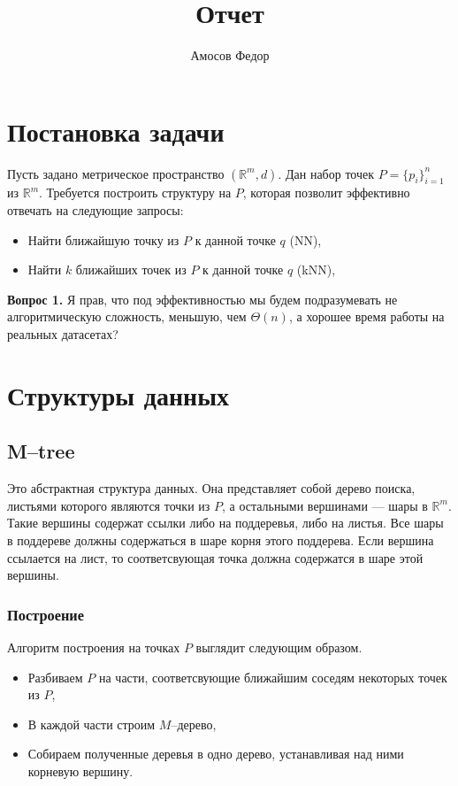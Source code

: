 \documentclass{article}
\title{\bf Отчет \No 1}
\author{Амосов Федор}
\begin{document}
    \maketitle
    
    \section{Постановка задачи}
        Пусть задано метрическое пространство $(\mathbb{R}^m, d)$. Дан набор точек $P = \{p_i\}_{i = 1}^n$ из $\mathbb{R}^m$. Требуется построить структуру на $P$, которая позволит эффективно отвечать на следующие запросы:
        \begin{itemize}
            \item Найти ближайшую точку из $P$ к данной точке $q$ (NN),
            \item Найти $k$ ближайших точек из $P$ к данной точке $q$ (kNN),
        \end{itemize}
        
        {\bf Вопрос 1.} Я прав, что под эффективностью мы будем подразумевать не алгоритмическую сложность, меньшую, чем $\Theta(n)$, а хорошее время работы на реальных датасетах?
    
    \section{Структуры данных}
        \subsection{M--tree}
            Это абстрактная структура данных. Она представляет собой дерево поиска, листьями которого являются точки из $P$, а остальными вершинами ---  шары в $\mathbb{R}^m$. Такие вершины содержат ссылки либо на поддеревья, либо на листья. Все шары в поддереве должны содержаться в шаре корня этого поддерева. Если вершина ссылается на лист, то соответсвующая точка должна содержатся в шаре этой вершины.
            \subsubsection{Построение}
                Алгоритм построения на точках $P$ выглядит следующим образом.
                \begin{itemize}
                    \item Разбиваем $P$ на части, соответсвующие ближайшим соседям некоторых точек из $P$,
                    \item В каждой части строим $M$--дерево,
                    \item Собираем полученные деревья в одно дерево, устанавливая над ними корневую вершину.
                \end{itemize}           
                                     
\end{document}
